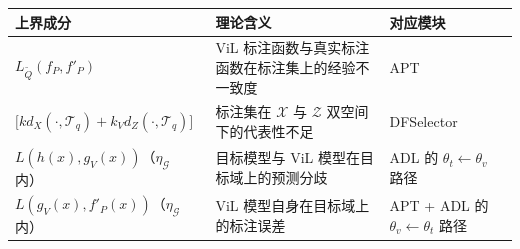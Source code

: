 \begin{table}[!htbp]
    \vspace{0.5em}\centering\wuhao

    \vspace{0.5em}\centering{}
    \setlength{\tabcolsep}{5pt}
    \renewcommand{\arraystretch}{1.2}
    \begin{tabularx}{\textwidth}{@{}p{}p{}p{}@{}}
    \toprule
    上界成分 & 理论含义 & 对应模块 \\
    \midrule
    $L_{\tilde{Q}}(f_P,f'_P)$ & ViL 标注函数与真实标注函数在标注集上的经验不一致度 & APT \\
    $\big[kd_X(\cdot,\mathcal{T}_q)+k_Vd_Z(\cdot,\mathcal{T}_q)\big]$ & 标注集在 $\mathcal{X}$ 与 $\mathcal{Z}$ 双空间下的代表性不足 & DFSelector \\
    $L(h(x),g_V(x))$（$\eta_{\mathcal{G}}$ 内） & 目标模型与 ViL 模型在目标域上的预测分歧 & ADL 的 $\theta_t\leftarrow\theta_v$ 路径 \\
    $L(g_V(x),f'_P(x))$（$\eta_{\mathcal{G}}$ 内） & ViL 模型自身在目标域上的标注误差 & APT + ADL 的 $\theta_v\leftarrow\theta_t$ 路径 \\
    \bottomrule
    \end{tabularx}
\end{table}


